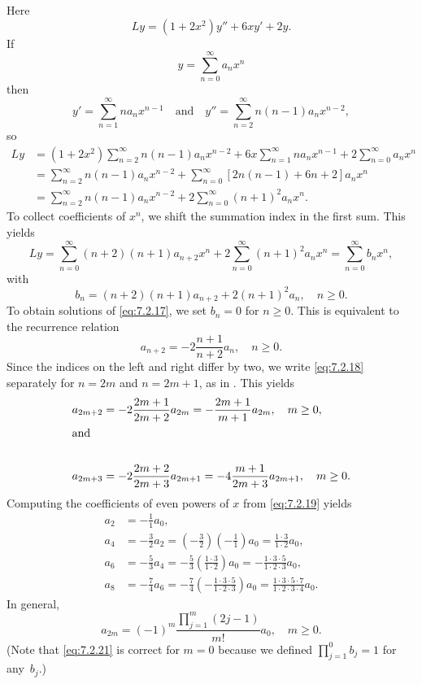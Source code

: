 \begin{solution}
Here
\[
Ly=(1+2x^2)y''+6xy'+2y.
\]
If
\[
y=\sum_{n=0}^\infty a_nx^n
\]
then
\[
y'=\sum_{n=1}^\infty na_nx^{n-1}\quad\text{and}\quad
y''=\sum_{n=2}^\infty n(n-1)a_nx^{n-2},
\]
so
\begin{align*}
Ly&=(1+2x^2) \sum^\infty_{n=2}n(n-1)a_nx^{n-2}+ 6x
 \sum^\infty_{n=1}na_nx^{n-1}
 +2 \sum^\infty_{n=0}a_nx^n\\
&=\sum_{n=2}^\infty n(n-1)a_nx^{n-2}+\sum_{n=0}^\infty
\left[2n(n-1)+6n+2\right]a_nx^n\\
&=\sum_{n=2}^\infty n(n-1)a_nx^{n-2}+2\sum_{n=0}^\infty(n+1)^2a_nx^n.
\end{align*}
To collect coefficients of $x^n$,  we shift the summation index
in the first sum.  This yields
\[
Ly=\sum_{n=0}^\infty(n+2)(n+1)a_{n+2}x^n+2\sum_{n=0}^\infty(n+1)^2a_nx^n
=\sum_{n=0}^\infty b_nx^n,
\]
with
\[
b_n=(n+2)(n+1)a_{n+2}+2(n+1)^2a_n,\quad n\ge0.
\]
To obtain solutions of \eqref{eq:7.2.17}, we set $b_n=0$ for $n\ge0$. This
is equivalent to the recurrence relation
 \begin{equation}\label{eq:7.2.18}
a_{n+2}=-2\frac{n+1}{n+2}a_n,\quad n\ge0.
\end{equation}
Since the
indices on the left and right differ by two, we write \eqref{eq:7.2.18}
separately for $n=2m$ and $n=2m+1$, as in .
This yields
\begin{align}
a_{2m+2}&=-2 \frac{2m+1}{2m+2}a_{2m}=-\frac{2m+1}{m+1}a_{2m},\quad m
\ge0,\label{eq:7.2.19}\\
\shortintertext{and}\\
a_{2m+3}&=-2\frac{2m+2}{2m+3}a_{2m+1}=-4\frac{m+1}{2m+3}a_{2m+1},\quad
m\ge0. \label{eq:7.2.20}
\end{align}
Computing the coefficients of even powers of $x$ from \eqref{eq:7.2.19}
yields
\begin{align*}
a_2&=-\frac{1}{1}a_0,\\[5pt]
a_4&=-\frac{3}{2}a_2=\left(-\frac{3}{2}\right)\left(-\frac{1}{1}\right)a_0
=\frac{1\cdot3}{1\cdot2}a_0,\\
a_6&=-\frac{5}{3}a_4=
-\frac{5}{3}\left(\frac{1\cdot3}{1\cdot2}\right)a_0
=-\frac{1\cdot3\cdot5}{1\cdot2\cdot3}a_0, \\[5pt]
a_8&=-\frac{7}{4}a_6=-\frac{7}{4}
\left(-\frac{1\cdot3\cdot5}{1\cdot2\cdot3}\right)a_0=
\frac{1\cdot3\cdot5\cdot7}{1\cdot2\cdot3\cdot4}a_0.
\end{align*}
In general,
\begin{equation}\label{eq:7.2.21}
a_{2m}=(-1)^m\frac{\prod_{j=1}^m(2j-1)}{m!}a_0,\quad m\ge0.
\end{equation}
(Note that \eqref{eq:7.2.21} is correct for $m=0$  because we
defined $\prod_{j=1}^0b_j=1$  for any~$b_j$.)


\end{solution}
